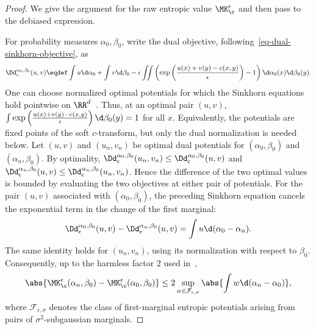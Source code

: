 \begin{proof}
	We give the argument for the raw entropic value \(\MK_\c^\epsilon\) and then pass to the debiased expression.

	For probability measures \(\alpha_0,\beta_0\), write the dual objective, following~\eqref{eq-dual-sinkhorn-objective}, as
	\[
	\Dd_\epsilon^{\alpha_0,\beta_0}(u,v)
	\eqdef
	\int u\d\alpha_0+\int v\d\beta_0
	-\epsilon\iint
	\left(
		\exp\left(\frac{u(x)+v(y)-c(x,y)}{\epsilon}\right)-1
	\right)
	\d\alpha_0(x)\d\beta_0(y).
	\]
	One can choose normalized optimal potentials for which the Sinkhorn equations hold pointwise on \(\RR^d\)~\cite{mena2019statistical}. Thus, at an optimal pair \((u,v)\),
	$\int \exp\left(\frac{u(x)+v(y)-c(x,y)}{\epsilon}\right) \d\beta_0(y) =1$ for all $x$.
	Equivalently, the potentials are fixed points of the soft \(c\)-transform, but only the dual normalization is needed below.
	Let \((u,v)\) and \((u_n,v_n)\) be optimal dual potentials for \((\alpha_0,\beta_0)\) and \((\alpha_n,\beta_0)\). By optimality,
	$\Dd_\epsilon^{\alpha_0,\beta_0}(u_n,v_n) \leq \Dd_\epsilon^{\alpha_0,\beta_0}(u,v)$ and $\Dd_\epsilon^{\alpha_n,\beta_0}(u,v) \leq \Dd_\epsilon^{\alpha_n,\beta_0}(u_n,v_n)$.
	Hence the difference of the two optimal values is bounded by evaluating the two objectives at either pair of potentials. For the pair \((u,v)\) associated with \((\alpha_0,\beta_0)\), the preceding Sinkhorn equation cancels the exponential term in the change of the first marginal:
	\[
	\Dd_\epsilon^{\alpha_0,\beta_0}(u,v)
	-
	\Dd_\epsilon^{\alpha_n,\beta_0}(u,v)
	=
	\int u\d(\alpha_0-\alpha_n).
	\]
	The same identity holds for \((u_n,v_n)\), using its normalization with respect to \(\beta_0\). Consequently, up to the harmless factor \(2\) used in~\cite{mena2019statistical},
	\[
	\abs{\MK_\c^\epsilon(\alpha_n,\beta_0)-\MK_\c^\epsilon(\alpha_0,\beta_0)}
	\leq
	2\sup_{w\in\mathcal F_{\epsilon,\sigma}}
	\abs{\int w\d(\alpha_n-\alpha_0)},
	\]
	where \(\mathcal F_{\epsilon,\sigma}\) denotes the class of first-marginal entropic potentials arising from pairs of \(\sigma^2\)-subgaussian marginals.


\end{proof}
